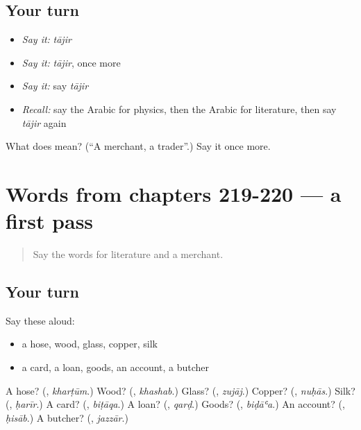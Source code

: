 \subsection*{Your turn}
\begin{itemize}
\raggedright
  \item \emph{Say it:} \emph{tājir}
  \item \emph{Say it:} \emph{tājir}, once more
  \item \emph{Say it:} say \emph{tājir}
  \item \emph{Recall:} say the Arabic for physics, then the Arabic for literature, then say \emph{tājir} again
\end{itemize}

\begin{tcolorbox}[breakable,colback=teal!4,colframe=teal!35!black,title={Before you move on}]
What does  mean? (\textquotedblleft{}A merchant, a trader\textquotedblright{}.) Say it once more.
\end{tcolorbox}
\section[(dialogue)]{Words from chapters 219-220 — a first pass}

\label{lesson:AR-R222-first-pass-words-from-chapters-219-220}



\begin{quote}
Say the words for literature and a merchant.
\end{quote}

\subsection*{Your turn}
Say these aloud:

\begin{itemize}
\raggedright
  \item a hose, wood, glass, copper, silk
  \item a card, a loan, goods, an account, a butcher
\end{itemize}

\begin{tcolorbox}[breakable,colback=teal!4,colframe=teal!35!black,title={Before you move on}]
A hose? (\textbf{}, \emph{kharṭūm}.) Wood? (\textbf{}, \emph{khashab}.) Glass? (\textbf{}, \emph{zujāj}.) Copper? (\textbf{}, \emph{nuḥās}.) Silk? (\textbf{}, \emph{ḥarīr}.) A card? (\textbf{}, \emph{biṭāqa}.) A loan? (\textbf{}, \emph{qarḍ}.) Goods? (\textbf{}, \emph{biḍāʿa}.) An account? (\textbf{}, \emph{ḥisāb}.) A butcher? (\textbf{}, \emph{jazzār}.)
\end{tcolorbox}
